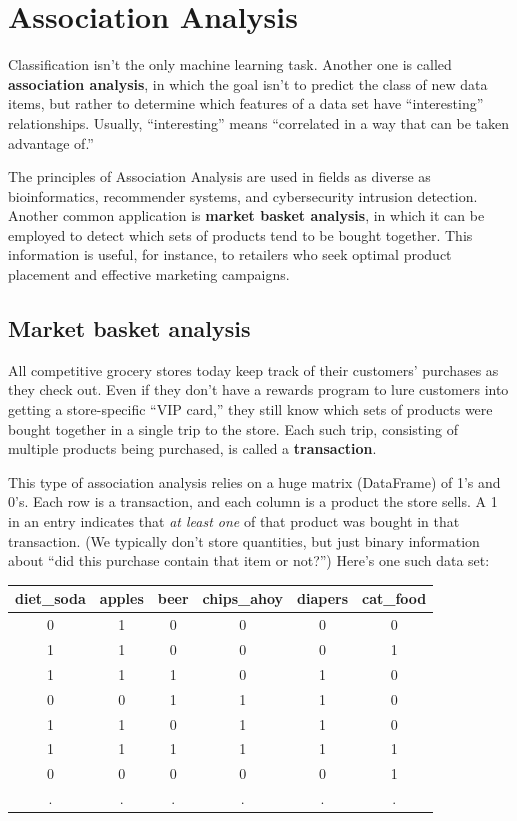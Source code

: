 
\chapter{Association Analysis}

Classification isn't the only machine learning task. Another one is called
\textbf{association analysis}, in which the goal isn't to predict the class of
new data items, but rather to determine which features of a data set have
``interesting'' relationships. Usually, ``interesting'' means ``correlated in a
way that can be taken advantage of.''

The principles of Association Analysis are used in fields as diverse as
bioinformatics, recommender systems, and cybersecurity intrusion detection.
Another common application is \textbf{market basket analysis}, in which it can
be employed to detect which sets of products tend to be bought together. This
information is useful, for instance, to retailers who seek optimal product
placement and effective marketing campaigns.

\section{Market basket analysis}

All competitive grocery stores today keep track of their customers' purchases
as they check out. Even if they don't have a rewards program to lure customers
into getting a store-specific ``VIP card,'' they still know which sets of
products were bought together in a single trip to the store. Each such trip,
consisting of multiple products being purchased, is called a
\textbf{transaction}.

This type of association analysis relies on a huge matrix (DataFrame) of 1's
and 0's. Each row is a transaction, and each column is a product the store
sells. A 1 in an entry indicates that \textit{at least one} of that product
was bought in that transaction. (We typically don't store quantities, but just
binary information about ``did this purchase contain that item or not?'')
Here's one such data set:

\begin{center}
\begin{tabular}{|c|c|c|c|c|c|}
\hline
diet\_soda & apples & beer & chips\_ahoy & diapers & cat\_food \\
\hline
0 & 1 & 0 & 0 & 0 & 0 \\
1 & 1 & 0 & 0 & 0 & 1 \\
1 & 1 & 1 & 0 & 1 & 0 \\
0 & 0 & 1 & 1 & 1 & 0 \\
1 & 1 & 0 & 1 & 1 & 0 \\
1 & 1 & 1 & 1 & 1 & 1 \\
0 & 0 & 0 & 0 & 0 & 1 \\
. & . & . & . & . & . \\
\hline
\end{tabular}
\end{center}

